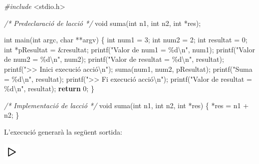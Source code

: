 \documentclass[]{book}
\newenvironment{Shaded}{\begin{snugshade}}{\end{snugshade}}
\newcommand{\CommentTok}[1]{\textcolor[rgb]{0.56,0.35,0.01}{\textit{#1}}}
\newcommand{\ControlFlowTok}[1]{\textcolor[rgb]{0.13,0.29,0.53}{\textbf{#1}}}
\newcommand{\DataTypeTok}[1]{\textcolor[rgb]{0.13,0.29,0.53}{#1}}
\newcommand{\DecValTok}[1]{\textcolor[rgb]{0.00,0.00,0.81}{#1}}
\newcommand{\ImportTok}[1]{#1}
\newcommand{\NormalTok}[1]{#1}
\newcommand{\PreprocessorTok}[1]{\textcolor[rgb]{0.56,0.35,0.01}{\textit{#1}}}
\newcommand{\SpecialCharTok}[1]{\textcolor[rgb]{0.00,0.00,0.00}{#1}}
\newcommand{\StringTok}[1]{\textcolor[rgb]{0.31,0.60,0.02}{#1}}
\begin{document}
\begin{Shaded}
\begin{Highlighting}[]
\PreprocessorTok{\#include }\ImportTok{\textless{}stdio.h\textgreater{}}

\CommentTok{/* Predeclaració de l\textquotesingle{}acció */}
\DataTypeTok{void}\NormalTok{ suma(}\DataTypeTok{int}\NormalTok{ n1, }\DataTypeTok{int}\NormalTok{ n2, }\DataTypeTok{int}\NormalTok{ *res);}

\DataTypeTok{int}\NormalTok{ main(}\DataTypeTok{int}\NormalTok{ argc, }\DataTypeTok{char}\NormalTok{ **argv) \{}
    \DataTypeTok{int}\NormalTok{ num1 = }\DecValTok{3}\NormalTok{;}
    \DataTypeTok{int}\NormalTok{ num2 = }\DecValTok{2}\NormalTok{;}
    \DataTypeTok{int}\NormalTok{ resultat = }\DecValTok{0}\NormalTok{;}
    \DataTypeTok{int}\NormalTok{ *pResultat = \&resultat;}
\NormalTok{    printf(}\StringTok{"Valor de num1 = \%d}\SpecialCharTok{\textbackslash{}n}\StringTok{"}\NormalTok{, num1);}
\NormalTok{    printf(}\StringTok{"Valor de num2 = \%d}\SpecialCharTok{\textbackslash{}n}\StringTok{"}\NormalTok{, num2);}
\NormalTok{    printf(}\StringTok{"Valor de resultat = \%d}\SpecialCharTok{\textbackslash{}n}\StringTok{"}\NormalTok{, resultat);}
\NormalTok{    printf(}\StringTok{"\textgreater{}\textgreater{} Inici execució acció}\SpecialCharTok{\textbackslash{}n}\StringTok{"}\NormalTok{); }
\NormalTok{    suma(num1, num2, pResultat);}
\NormalTok{    printf(}\StringTok{"Suma = \%d}\SpecialCharTok{\textbackslash{}n}\StringTok{"}\NormalTok{, resultat);}
\NormalTok{    printf(}\StringTok{"\textgreater{}\textgreater{} Fi execució acció}\SpecialCharTok{\textbackslash{}n}\StringTok{"}\NormalTok{);}
\NormalTok{    printf(}\StringTok{"Valor de resultat = \%d}\SpecialCharTok{\textbackslash{}n}\StringTok{"}\NormalTok{, resultat);}
    \ControlFlowTok{return} \DecValTok{0}\NormalTok{;}
\NormalTok{\}}

\CommentTok{/* Implementació de l\textquotesingle{}acció */}
\DataTypeTok{void}\NormalTok{ suma(}\DataTypeTok{int}\NormalTok{ n1, }\DataTypeTok{int}\NormalTok{ n2, }\DataTypeTok{int}\NormalTok{ *res) \{}
\NormalTok{    *res = n1 + n2;}
\NormalTok{\}}
\end{Highlighting}
\end{Shaded}

L'execució generarà la següent sortida:

\includegraphics{./img/play.png}
\end{document}
